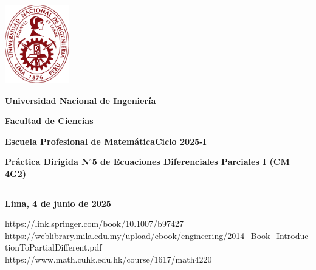 



\noindent\parbox[c]{.18\textwidth}{\includegraphics[width=2.8cm]{logouni}}\hfill
\parbox[c]{1\textwidth}{\raggedright%
    {\large\textbf{Universidad Nacional de Ingeniería} \par\smallskip}
    {\large\textbf{Facultad de Ciencias} \par\smallskip}
    {\large\textbf{Escuela Profesional de Matemática}\hfil\qquad\qquad\qquad\textbf{Ciclo 2025-I}}
}

\begin{center}\bfseries\large
    Práctica Dirigida N$^{\circ}$5 de Ecuaciones Diferenciales
    Parciales I (CM 4G2)
\end{center}

\vspace{-0.5cm}

\hrulefill
\vspace{-2.5mm}

\rule{16.5cm}{0.8mm}

\begin{questions}
    
\end{questions}

\vfill
\begin{flushright}\bfseries
    Lima, 4 de junio de 2025
\end{flushright}

\clearpage

\appendix




https://link.springer.com/book/10.1007/b97427
https://weblibrary.mila.edu.my/upload/ebook/engineering/2014_Book_IntroductionToPartialDifferent.pdf
https://www.math.cuhk.edu.hk/course/1617/math4220
